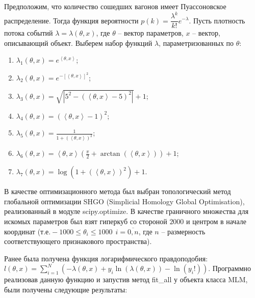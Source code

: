 Предположим, что количество сошедших вагонов имеет Пуассоновское распределение. Тогда функция вероятности $p(k) = \dfrac{\lambda^k}{k!}e^{-\lambda}$. Пусть плотность потока событий $\lambda = \lambda(\theta, x)$, где $\theta$ -- вектор параметров, $x$ -- вектор, описывающий объект. Выберем набор функций $\lambda$, параметризованных по $\theta$:
\begin{enumerate}[label=\arabic*.]
    \item $\lambda_1(\theta, x) = e^{\left\langle \theta, x\right\rangle}$;
    \item $\lambda_2(\theta, x) = e^{-[\left\langle \theta, x\right\rangle]^2}$;
    \item $\lambda_3(\theta, x) = \sqrt{|5^2 - (\left\langle \theta, x\right\rangle - 5)^2|} + 1$;
    \item $\lambda_4(\theta, x) = (\left\langle \theta, x\right\rangle - 1)^2$;
    \item $\lambda_5(\theta, x) = \frac{1}{1 + (\left\langle \theta, x\right\rangle)^2}$;
    \item $\lambda_6(\theta, x) = \left\langle \theta, x\right\rangle (\frac{\pi}{2} + \arctan(\left\langle \theta, x\right\rangle)) + 1$;
    \item $\lambda_7(\theta, x) = \log(1 + (\left\langle \theta, x\right\rangle)^2) + 1$.
\end{enumerate}

В качестве оптимизационного метода был выбран топологический метод глобальной оптимизации SHGO (Simplicial Homology Global Optimisation), реализованный в модуле scipy.optimize. В качестве граничного множества для искомых параметров был взят гиперкуб со стороной $2000$ и центром в начале координат (т.е$. -1000 \leq \theta_i \leq 1000~~i = \overline{0,n}$, где $n$ -- размерность соответствующего признакового пространства).

Ранее была получена функция логарифмического правдоподобия: $l(\theta, x) = \sum\limits_{i=1}^{N} \left( -\lambda(\theta, x) + y_i \ln(\lambda(\theta, x)) - \ln(y_i!) \right)$. Программно реализовав данную функцию и запустив метод fit\_all у объекта класса MLM, были получены следующие результаты:




